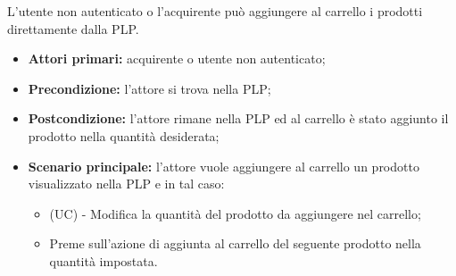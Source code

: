 
L'utente non autenticato o l'acquirente può aggiungere al carrello i prodotti direttamente dalla PLP.
\begin{itemize}
    \item \textbf{Attori primari:} acquirente o utente non autenticato;
    \item \textbf{Precondizione:} l'attore si trova nella PLP;
    \item \textbf{Postcondizione:} l'attore rimane nella PLP ed al carrello è stato aggiunto il prodotto nella quantità desiderata;
    \item \textbf{Scenario principale:} l'attore vuole aggiungere al carrello un prodotto visualizzato nella PLP e in tal caso:
    \begin{itemize}
        \item (UC) - Modifica la quantità del prodotto da aggiungere nel carrello;
        \item Preme sull'azione di aggiunta al carrello del seguente prodotto nella quantità impostata.
    \end{itemize}
\end{itemize}
